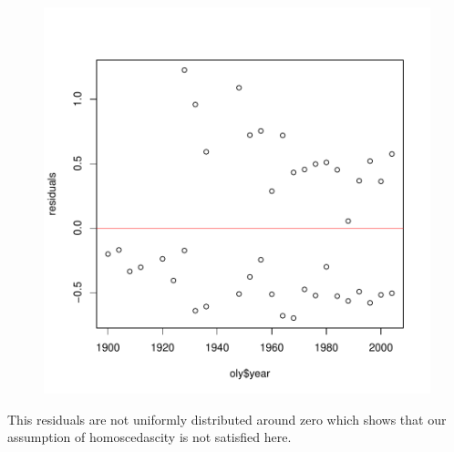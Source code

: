 \documentclass[12pt]{article}
\begin{document}
\begin{figure}[H]
\includegraphics{HW4-011}
\end{figure}
This residuals are not uniformly distributed around zero which shows that our assumption of homoscedascity is not satisfied here.
\end{document}

